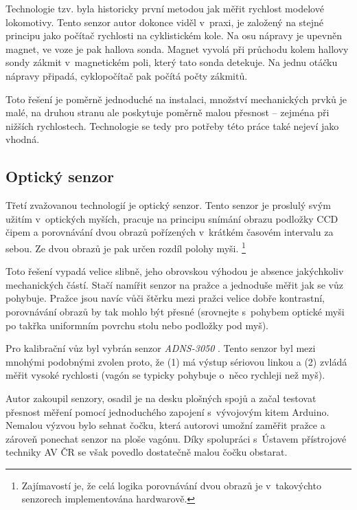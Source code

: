 Technologie tzv.  byla historicky první metodou jak měřit
rychlost modelové lokomotivy. Tento senzor autor dokonce viděl v~praxi, je
založený na stejné principu jako počítač rychlosti na cyklistickém kole.  Na
osu nápravy je upevněn magnet, ve voze je pak hallova sonda. Magnet vyvolá při
průchodu kolem hallovy sondy zákmit v~magnetickém poli, který tato sonda
detekuje. Na jednu otáčku nápravy připadá, cyklopočítač pak počítá počty zákmitů.

Toto řešení je poměrně jednoduché na instalaci, množství mechanických prvků je
malé, na druhou stranu ale poskytuje poměrně malou přesnost -- zejména při
nižších rychlostech. Technologie  se tedy pro potřeby této
práce také nejeví jako vhodná.

\subsection{Optický senzor}
\label{subsec:wsm-senzor-opto}

Třetí zvažovanou technologií je optický senzor. Tento senzor je proslulý svým
užitím v~optických myších, pracuje na principu snímání obrazu podložky CCD
čipem a porovnávání dvou obrazů pořízených v~krátkém časovém intervalu za
sebou. Ze dvou obrazů je pak určen rozdíl polohy myši. \footnote{Zajímavostí
je, že celá logika porovnávání dvou obrazů je v~takovýchto senzorech
implementována hardwarově.}

Toto řešení vypadá velice slibně, jeho obrovskou výhodou je absence jakýchkoliv
mechanických částí. Stačí namířit senzor na pražce a jednoduše měřit jak se vůz
pohybuje. Pražce jsou navíc vůči štěrku mezi pražci velice dobře kontrastní,
porovnávání obrazů by tak mohlo být přesné (srovnejte s~pohybem optické
myši po takřka uniformním povrchu stolu nebo podložky pod myš).

Pro kalibrační vůz byl vybrán senzor \textit{ADNS-3050} \cite{adns-3050}.
Tento senzor byl mezi mnohými podobnými zvolen proto, že (1) má výstup sériovou
linkou a (2) zvládá měřit vysoké rychlosti (vagón se typicky pohybuje o~něco
rychleji než myš).

Autor zakoupil senzory, osadil je na desku plošných spojů a začal testovat
přesnost měření pomocí jednoduchého zapojení s~vývojovým kitem Arduino. Nemalou
výzvou bylo sehnat čočku, která autorovi umožní zaměřit pražce a zároveň
ponechat senzor na ploše vagónu. Díky spolupráci s~Ústavem přístrojové techniky
AV ČR se však povedlo dostatečně malou čočku obstarat.

